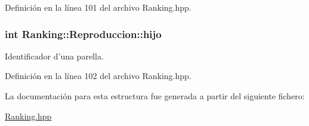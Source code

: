 Definición en la línea 101 del archivo Ranking.\-hpp.

\hypertarget{struct_ranking_1_1_reproduccion_a96ddc3ebb77c33028e557ed0a87d31ab}{
\subsubsection[{hijo}]{\setlength{\rightskip}{0pt plus 5cm}int Ranking\-::\-Reproduccion\-::hijo}}\label{struct_ranking_1_1_reproduccion_a96ddc3ebb77c33028e557ed0a87d31ab}


Identificador d'una parella. 



Definición en la línea 102 del archivo Ranking.\-hpp.



La documentación para esta estructura fue generada a partir del siguiente fichero\-:\begin{DoxyCompactItemize}
\item 
\hyperlink{_ranking_8hpp}{Ranking.\-hpp}\end{DoxyCompactItemize}
